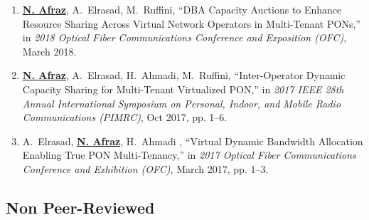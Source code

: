 \begin{enumerate}
    \item \textbf{\underline{N. {Afraz}}}, A.~{Elrasad}, M.~{Ruffini}, ``DBA Capacity Auctions to Enhance Resource Sharing Across Virtual Network Operators in Multi-Tenant PONs,'' in \emph{2018 Optical Fiber Communications Conference and Exposition (OFC)}, March 2018.
   
    \item \textbf{\underline{N. {Afraz}}}, A.~{Elrasad}, H.~Ahmadi,  M.~{Ruffini}, ``Inter-Operator Dynamic Capacity Sharing for Multi-Tenant Virtualized PON,'' in \emph{2017 IEEE 28th Annual International Symposium on Personal, Indoor, and Mobile Radio Communications (PIMRC)}, Oct 2017, pp. 1--6.

    \item A.~{Elrasad}, \textbf{\underline{N. {Afraz}}}, H.~Ahmadi , ``Virtual Dynamic Bandwidth Allocation Enabling True PON Multi-Tenancy,'' in \emph{2017 Optical Fiber Communications Conference and Exhibition (OFC)}, March 2017, pp. 1--3.


 \end{enumerate}
 \subsection{Non Peer-Reviewed}
